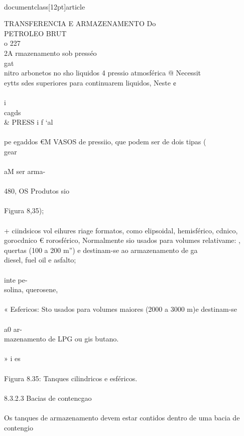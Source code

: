 \\documentclass[12pt]{article}
\begin{document}
TRANSFERENCIA E ARMAZENAMENTO Do\\
PETROLEO BRUT\\
o 227\\
2A rmazenamento sob presséo\\
gat\\
nitro arbonetos no sho liquidos 4 pressio atmosférica @ Necessit\\
eytts sdes superiores para continuarem liquidos, Neste ¢\\
\\
i\\
cagds \\& PRESS i f ‘al\\
\\
pe egaddos €M VASOS de pressiio, que podem ser de dois tipas (\\
gear\\
\\
aM ser arma-\\
\\
480, OS Produtos sio\\
\\
Figura 8,35);\\
\\
+ ciindsicos vol eihures riage formatos, como elipsoidal, hemisférico, cdnico,\\
gorocdnico € rorosférico, Normalmente sio usados para volumes relativame: ,\\
quertas (100 a 200 m”) e destinam-se ao armazenamento de ga\\
diesel, fuel oil e asfalto;\\
\\
inte pe-\\
solina, querosene,\\
\\
« Esfericos: Sto usados para volumes maiores (2000 a 3000 m)e destinam-se\\
\\
a0 ar-\\
mazenamento de LPG ou gis butano.\\
\\
» i es\\
\\
Figura 8.35: Tanques cilindricos e esféricos.\\
\\
8.3.2.3 Bacias de contencgao\\
\\
Os tanques de armazenamento devem estar contidos dentro de uma bacia de contengio\\
\end{document}
